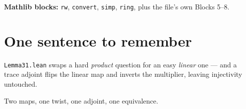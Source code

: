 \documentclass[11pt]{article}
\begin{document}
\textbf{Mathlib blocks:} \texttt{rw}, \texttt{convert}, \texttt{simp},
\texttt{ring}, plus the file's own Blocks 5--8.

\section{One sentence to remember}

\texttt{Lemma31.lean} swaps a hard \emph{product} question for an easy
\emph{linear} one --- and a trace adjoint flips the linear map and inverts the
multiplier, leaving injectivity untouched.

\bigskip
\begin{center}\small
Two maps, one twist, one adjoint, one equivalence.
\end{center}
\end{document}
